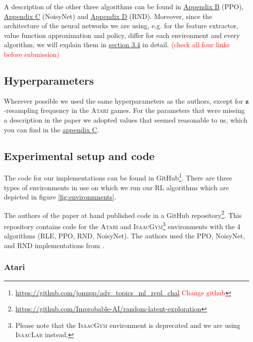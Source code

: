 \documentclass[10pt]{article} %
\begin{document}
\noindent A description of the other three algorithms can be found in \hyperlink{algo-ppo}{Appendix B} (PPO), \hyperlink{algo-noisynet}{Appendix C} (NoisyNet) and \hyperlink{algo-rnd}{Appendix D} (RND). Moreover, since the architecture of the neural networks we are using, e.g. for the feature extractor, value function approximation and policy, differ for each environment and every algorithm, we will explain them in \hyperlink{experimental-setup}{section 3.4} in detail. \textcolor{red}{(check all four links before submission)}

\hypertarget{hyperparameter-subsection}{\subsection{Hyperparameters}}

Wherever possible we used the same hyperparameters as the authors, except for $\textbf{z}$-resampling frequency in the \textsc{Atari} games. For the parameters that were missing a description in the paper we adopted values that seemed reasonable to us, which you can find in the \hyperlink{appendix-hyperparams}{appendix C}.

\hypertarget{experimental-setup}{\subsection{Experimental setup and code}}

The code for our implementations can be found in GitHub\footnote{\href{https://github.com/jonupp/adv_topics_ml_repl_chal}{https://github.com/jonupp/adv\_topics\_ml\_repl\_chal} \textcolor{red}{Change github}}. There are three types of environments in use on which we run our RL algorithms which are depicted in figure \ref{fig:environmnents}. 

\noindent The authors of the paper at hand published code in a GitHub repository\footnote{\href{https://github.com/Improbable-AI/random-latent-exploration}{https://github.com/Improbable-AI/random-latent-exploration}}. This repository contains code for the \textsc{Atari} and \textsc{IsaacGym}\footnote{Please note that the \textsc{IsaacGym} environment is deprecated and we are using \textsc{IsaacLab} instead.} environments with the 4 algorithms (RLE, PPO, RND, NoisyNet). The authors used the PPO, NoisyNet, and RND implementations from \cite{clearnrl-paper}.

\subsubsection{Atari}
\end{document}
